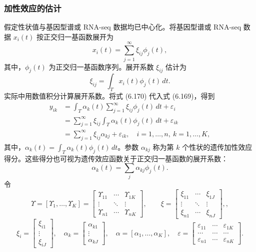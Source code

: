 \subsubsection{加性效应的估计}

假定性状值与基因型谱或 RNA-seq 数据均已中心化。将基因型谱或 RNA-seq 数据 $x_i(t)$ 按正交归一基函数展开为
\begin{equation}
x_i(t)=\sum_{j=1}^{\infty}\xi_{ij}\phi_j(t),
\tag{6.170}
\end{equation}
其中，$\phi_j(t)$ 为正交归一基函数序列。展开系数 $\xi_{ij}$ 估计为
\begin{equation}
\xi_{ij}=\int_Tx_i(t)\phi_j(t)\,dt.
\tag{6.171}
\end{equation}
实际中用数值积分计算展开系数。将式 (6.170) 代入式 (6.169)，得到
\begin{equation}
\begin{aligned}
y_{ik}&=\int_T\alpha_k(t)\sum_{j=1}^{\infty}\xi_{ij}\phi_j(t)\,dt+\varepsilon_i\\
&=\sum_{j=1}^{\infty}\xi_{ij}\int_T\alpha_k(t)\phi_j(t)\,dt+\varepsilon_{ik}\\
&=\sum_{j=1}^{\infty}\xi_{ij}\alpha_{kj}+\varepsilon_{ik},\quad i=1,\ldots,n,\ k=1,\ldots,K,
\end{aligned}\tag{6.172}
\end{equation}
其中，$\alpha_k(t)=\int_T\alpha_k(t)\phi_j(t)\,dt$。参数 $\alpha_{kj}$ 称为第 $k$ 个性状的遗传加性效应得分。这些得分也可视为遗传效应函数关于正交归一基函数的展开系数：
\begin{equation}
\alpha_k(t)=\sum_j\alpha_{kj}\phi_j(t).
\tag{6.173}
\end{equation}
令
\[
\Upsilon=[\Upsilon_1,\ldots,\Upsilon_K]=\begin{bmatrix}
\Upsilon_{11}&\cdots&\Upsilon_{1K}\\\vdots&\ddots&\vdots\\\Upsilon_{n1}&\cdots&\Upsilon_{nK}
\end{bmatrix},\qquad
\xi=\begin{bmatrix}\xi_{11}&\cdots&\xi_{1J}\\\vdots&\ddots&\vdots\\\xi_{n1}&\cdots&\xi_{nJ}\end{bmatrix},,
\]
\[
\xi_i=\begin{bmatrix}\xi_{i1}\\\vdots\\\xi_{iJ}\end{bmatrix},\quad
\alpha_k=\begin{bmatrix}\alpha_{k1}\\\vdots\\\alpha_{kJ}\end{bmatrix},\quad
\alpha=[\alpha_1,\ldots,\alpha_K],\quad
\varepsilon=\begin{bmatrix}\varepsilon_{11}&\cdots&\varepsilon_{1K}\\\cdots&\cdots&\cdots\\\varepsilon_{n1}&\cdots&\varepsilon_{nK}\end{bmatrix}.
\]
